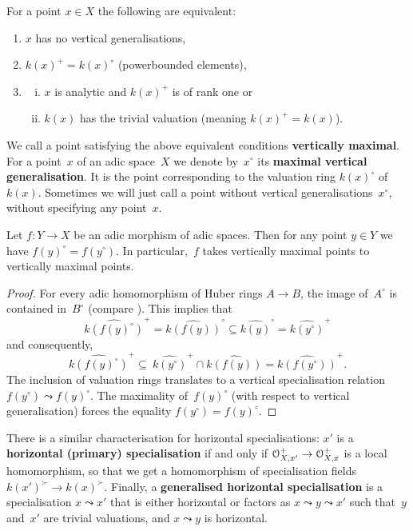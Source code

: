 For a point $x\in X$ the following are equivalent:
\begin{enumerate}
    \item $x$ has no vertical generalisations,
    \item $k(x)^+ = k(x)^\circ$ (powerbounded elements),
    \item \begin{enumerate}[(i)]
            \item $x$ is analytic and $k(x)^+$ is of rank one or
            \item $k(x)$ has the trivial valuation (meaning $k(x)^+=k(x)$).
          \end{enumerate}
\end{enumerate}
We call a point satisfying the above equivalent conditions {\bf vertically maximal}.
For a point~$x$ of an adic space~$X$ we denote by~$x^\circ$ its {\bf maximal vertical generalisation}. 
It is the point corresponding to the valuation ring $k(x)^\circ$ of~$k(x)$.
Sometimes we will just call a point without vertical generalisations~$x^\circ$, without specifying any point~$x$.

\begin{lem} \label{lem:adic-preserves-vertical-maximal}
    Let $f \colon Y \to X$ be an adic morphism of adic spaces.
    Then for any point $y \in Y$ we have $f(y)^\circ = f(y^\circ)$.
    In particular,~$f$ takes vertically maximal points to vertically maximal points.
\end{lem}

\begin{proof}
    For every adic homomorphism of Huber rings $A \to B$, the image of~$A^\circ$ is contained in~$B^\circ$ (compare \cite[Lemma~1.8~(i)]{HuberContinuousValuations}).
    This implies that
    \[
        \widehat{k(f(y)^\circ)}^+ = \widehat{k(f(y))}^\circ \subseteq \widehat{k(y)}^\circ = \widehat{k(y^\circ)}^+
    \]
    and consequently, 
    \[
        \widehat{k(f(y)^\circ)}^+ \subseteq \ \widehat{k(y^\circ)}^+ \cap \widehat{k(f(y))} = \widehat{k(f(y^\circ))}^+.
    \]
    The inclusion of valuation rings translates to a vertical specialisation relation $f(y^\circ) \leadsto f(y)^\circ$.
    The maximality of~$f(y)^\circ$ (with respect to vertical generalisation) forces the equality $f(y^\circ) = f(y)^\circ$.
\end{proof}

There is a similar characterisation for horizontal specialisations: $x'$ is a {\bf horizontal (primary) specialisation} if and only if ${\mathcal O}_{X,x'}^+\to{\mathcal O}^+_{X, x}$ is a local homomorphism, so that we get a homomorphism of specialisation fields $k(x')^\succ \to k(x)^\succ$.
Finally, a {\bf generalised horizontal specialisation} is a specialisation $x \leadsto x'$ that is either horizontal or factors as $x \leadsto y \leadsto x'$ such that~$y$ and~$x'$ are trivial valuations, and $x \leadsto y$ is horizontal.


